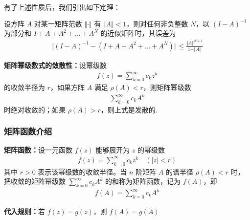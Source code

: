             \par 有了上述性质后，我们引出如下定理：
            \par 设方阵 $A$ 对某一矩阵范数 $\Vert \cdot \Vert$ 有 $\Vert A \Vert < 1$，则对任何非负整数 $N$，以 $(I - A)^{-1}$ 为部分和 $I + A + A^2 + \dots + A^N$ 的近似矩阵时，其误差为 
            \begin{align*}
                \Vert (I - A)^{-1} - (I + A + A^2 + \dots + A^N) \Vert \leq \frac{\Vert A \Vert^{N + 1}}{1 - \Vert A \Vert}
            \end{align*}
            \par \textbf{矩阵幂级数式的敛散性：}设幂级数
            \begin{align*}
                f(z) = \sum_{k=0}^{\infty}c_kz^k
            \end{align*}
            的收敛半径为 $r$，如果方阵 $A$ 满足 $\rho(A) < r$，则矩阵幂级数 
            \begin{align*}
                \sum_{k=0}^{\infty}c_kA^k
            \end{align*}    
            时绝对收敛的；如果 $\rho(A) > r$，则上式是发散的.
        \subsubsection{矩阵函数介绍}
            \par \textbf{矩阵函数：}设一元函数 $f(z)$ 能够展开为 $z$ 的幂级数 
            \begin{align*}
                f(z) = \sum_{k=0}^{\infty}c_kz^k \quad (|z| < r)
            \end{align*}
            其中 $r > 0$ 表示该幂级数的收敛半径。当 $n$ 阶矩阵 $A$ 的谱半径 $\rho(A) < r$ 时，把收敛的矩阵幂级数 $\sum_{k=0}^{\infty}c_kA^k$ 的和称为矩阵函数，记为 $f(A)$，即
            \begin{align*}
                f(A) = \sum_{k=0}^{\infty}c_kA^k \tag{3.3.2}
            \end{align*}

            \textbf{代入规则：}若 $f(z) = g(z)$，则 $f(A) = g(A)$

